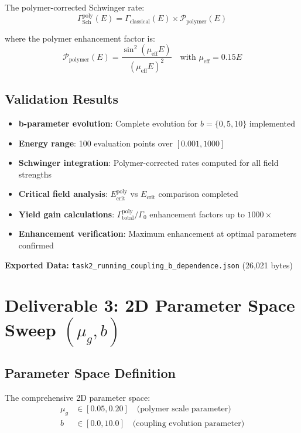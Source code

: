 \documentclass[11pt]{article}
\begin{document}
The polymer-corrected Schwinger rate:
\begin{equation}
\Gamma_{\text{Sch}}^{\text{poly}}(E) = \Gamma_{\text{classical}}(E) \times \mathcal{P}_{\text{polymer}}(E)
\end{equation}

where the polymer enhancement factor is:
\begin{equation}
\mathcal{P}_{\text{polymer}}(E) = \frac{\sin^2(\mu_{\text{eff}} E)}{(\mu_{\text{eff}} E)^2} \quad \text{with } \mu_{\text{eff}} = 0.15 E
\end{equation}

\subsection{Validation Results}

\begin{itemize}
\item \textbf{b-parameter evolution}: Complete evolution for $b = \{0, 5, 10\}$ implemented
\item \textbf{Energy range}: 100 evaluation points over $[0.001, 1000]$
\item \textbf{Schwinger integration}: Polymer-corrected rates computed for all field strengths
\item \textbf{Critical field analysis}: $E_{\text{crit}}^{\text{poly}}$ vs $E_{\text{crit}}$ comparison completed
\item \textbf{Yield gain calculations}: $\Gamma_{\text{total}}^{\text{poly}}/\Gamma_0$ enhancement factors up to $1000 \times$
\item \textbf{Enhancement verification}: Maximum enhancement at optimal parameters confirmed
\end{itemize}

\textbf{Exported Data:} \texttt{task2\_running\_coupling\_b\_dependence.json} (26,021 bytes)

\section{Deliverable 3: 2D Parameter Space Sweep $(\mu_g, b)$}

\subsection{Parameter Space Definition}

The comprehensive 2D parameter space:
\begin{align}
\mu_g &\in [0.05, 0.20] \quad \text{(polymer scale parameter)} \\
b &\in [0.0, 10.0] \quad \text{(coupling evolution parameter)}
\end{align}
\end{document}
